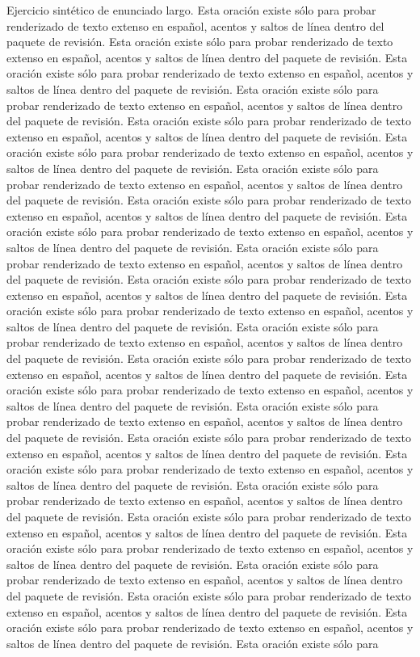 Ejercicio sintético de enunciado largo. Esta oración existe sólo para probar renderizado de texto extenso en español, acentos y saltos de línea dentro del paquete de revisión. Esta oración existe sólo para probar renderizado de texto extenso en español, acentos y saltos de línea dentro del paquete de revisión. Esta oración existe sólo para probar renderizado de texto extenso en español, acentos y saltos de línea dentro del paquete de revisión. Esta oración existe sólo para probar renderizado de texto extenso en español, acentos y saltos de línea dentro del paquete de revisión. Esta oración existe sólo para probar renderizado de texto extenso en español, acentos y saltos de línea dentro del paquete de revisión. Esta oración existe sólo para probar renderizado de texto extenso en español, acentos y saltos de línea dentro del paquete de revisión. Esta oración existe sólo para probar renderizado de texto extenso en español, acentos y saltos de línea dentro del paquete de revisión. Esta oración existe sólo para probar renderizado de texto extenso en español, acentos y saltos de línea dentro del paquete de revisión. Esta oración existe sólo para probar renderizado de texto extenso en español, acentos y saltos de línea dentro del paquete de revisión. Esta oración existe sólo para probar renderizado de texto extenso en español, acentos y saltos de línea dentro del paquete de revisión. Esta oración existe sólo para probar renderizado de texto extenso en español, acentos y saltos de línea dentro del paquete de revisión. Esta oración existe sólo para probar renderizado de texto extenso en español, acentos y saltos de línea dentro del paquete de revisión. Esta oración existe sólo para probar renderizado de texto extenso en español, acentos y saltos de línea dentro del paquete de revisión. Esta oración existe sólo para probar renderizado de texto extenso en español, acentos y saltos de línea dentro del paquete de revisión. Esta oración existe sólo para probar renderizado de texto extenso en español, acentos y saltos de línea dentro del paquete de revisión. Esta oración existe sólo para probar renderizado de texto extenso en español, acentos y saltos de línea dentro del paquete de revisión. Esta oración existe sólo para probar renderizado de texto extenso en español, acentos y saltos de línea dentro del paquete de revisión. Esta oración existe sólo para probar renderizado de texto extenso en español, acentos y saltos de línea dentro del paquete de revisión. Esta oración existe sólo para probar renderizado de texto extenso en español, acentos y saltos de línea dentro del paquete de revisión. Esta oración existe sólo para probar renderizado de texto extenso en español, acentos y saltos de línea dentro del paquete de revisión. Esta oración existe sólo para probar renderizado de texto extenso en español, acentos y saltos de línea dentro del paquete de revisión. Esta oración existe sólo para probar renderizado de texto extenso en español, acentos y saltos de línea dentro del paquete de revisión. Esta oración existe sólo para probar renderizado de texto extenso en español, acentos y saltos de línea dentro del paquete de revisión. Esta oración existe sólo para probar renderizado de texto extenso en español, acentos y saltos de línea dentro del paquete de revisión. Esta oración existe sólo para 